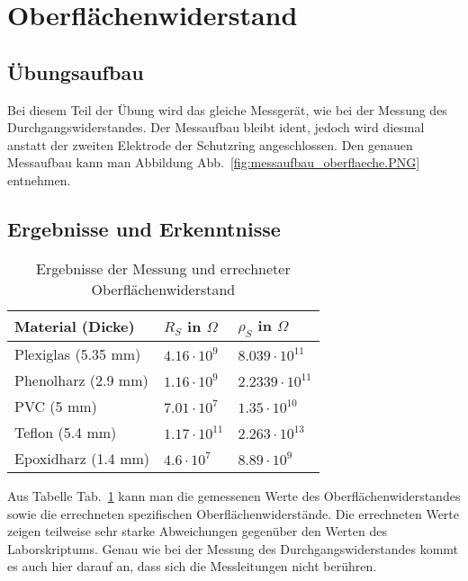 \documentclass[a4paper,twoside,12pt,DIV=13,BCOR=5mm,numbers=noenddot,cleardoublepage=empty]{scrbook}
\begin{document}
        \section{Oberfl\"achenwiderstand}
            \subsection{\"Ubungsaufbau}
            Bei diesem Teil der \"Ubung wird das gleiche Messger\"at, wie bei der Messung des Durchgangswiderstandes.
            Der Messaufbau bleibt ident, jedoch wird diesmal anstatt der zweiten Elektrode
            der Schutzring angeschlossen. Den genauen Messaufbau kann man Abbildung Abb.~\ref{fig:messaufbau_oberflaeche.PNG} entnehmen.
            \subsection{Ergebnisse und Erkenntnisse}
            \begin{table}[h]
                \begin{center}
                    \begin{tabular}{|l||l|l|}
                        \hline
                        Material (Dicke) & $R_S$ in $\Omega$ & $\rho_S$ in $\Omega$ \\
                        \hline
                        \hline
                        Plexiglas (5.35 mm) & $4.16 \cdot 10^{9}$ & $8.039 \cdot 10^{11}$ \\
                        \hline
                        Phenolharz (2.9 mm) & $1.16 \cdot 10^{9}$ & $2.2339 \cdot 10^{11}$ \\
                        \hline
                        PVC (5 mm) & $7.01 \cdot 10^{7}$ & $1.35 \cdot 10^{10}$ \\
                        \hline
                        Teflon (5.4 mm) & $1.17 \cdot 10^{11}$ & $2.263 \cdot 10^{13}$ \\
                        \hline
                        Epoxidharz (1.4 mm) & $4.6 \cdot 10^{7}$ & $8.89 \cdot 10^{9}$ \\
                        \hline
                    \end{tabular}
                    \caption{Ergebnisse der Messung und errechneter Oberfl\"achenwiderstand}
                    \label{tab:table3}
                \end{center}
            \end{table}
            Aus Tabelle Tab.~\ref{tab:table3} kann man die gemessenen Werte des Oberfl\"achenwiderstandes
            sowie die errechneten spezifischen Oberfl\"achenwiderst\"ande. Die errechneten Werte
            zeigen teilweise sehr starke Abweichungen gegen\"uber den Werten des Laborskriptums.
            Genau wie bei der Messung des Durchgangswiderstandes kommt es auch hier darauf
            an, dass sich die Messleitungen nicht ber\"uhren.
\end{document}
